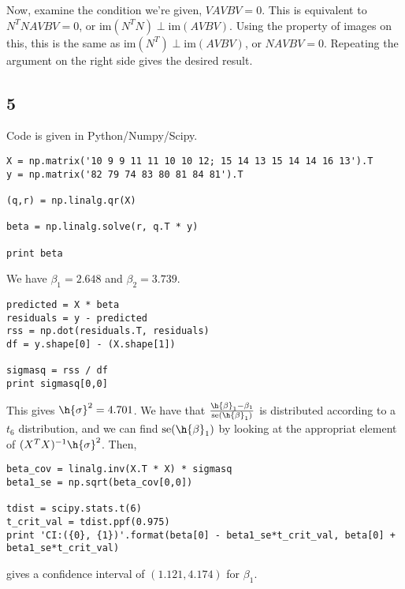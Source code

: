 \documentclass{article}
\begin{document}
Now, examine the condition we're given, $VAVBV=0$. This is equivalent to $N^TNAVBV=0$, or $\text{im}(N^TN)\perp\text{im}(AVBV)$. Using the property of images on this, this is the same as $\text{im}(N^T)\perp\text{im}(AVBV)$, or $NAVBV=0$. Repeating the argument on the right side gives the desired result.

\subsection*{5}
Code is given in Python/Numpy/Scipy. 
\begin{verbatim}
X = np.matrix('10 9 9 11 11 10 10 12; 15 14 13 15 14 14 16 13').T
y = np.matrix('82 79 74 83 80 81 84 81').T

(q,r) = np.linalg.qr(X)

beta = np.linalg.solve(r, q.T * y)

print beta
\end{verbatim}
We have $\beta_1=2.648$ and $\beta_2=3.739$.
\begin{verbatim}
predicted = X * beta
residuals = y - predicted
rss = np.dot(residuals.T, residuals)
df = y.shape[0] - (X.shape[1])

sigmasq = rss / df
print sigmasq[0,0]
\end{verbatim}
This gives $\h{\sigma}^2=4.701$.
We have that $\frac{\h{\beta}_1-\beta_1}{\text{se}(\h{\beta}_1)}$ is distributed according to a $t_6$ distribution, and we can find $\text{se}(\h{\beta}_1)$ by looking at the appropriat element of $(X^TX)^{-1}\h{\sigma}^2$. Then,
\begin{verbatim}
beta_cov = linalg.inv(X.T * X) * sigmasq
beta1_se = np.sqrt(beta_cov[0,0])

tdist = scipy.stats.t(6)
t_crit_val = tdist.ppf(0.975)
print 'CI:({0}, {1})'.format(beta[0] - beta1_se*t_crit_val, beta[0] + beta1_se*t_crit_val)
\end{verbatim}
gives a confidence interval of $(1.121,4.174)$ for $\beta_1$.
\end{document}
